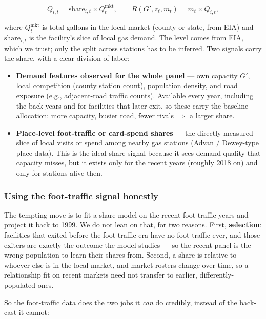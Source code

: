 \documentclass[
  letterpaper,
  DIV=11,
  numbers=noendperiod]{scrartcl}
\providecommand{\tightlist}{%
  \setlength{\itemsep}{0pt}\setlength{\parskip}{0pt}}\usepackage{longtable,booktabs,array}
\begin{document}
\[
Q_{i,t} = \text{share}_{i,t} \times Q^{\text{mkt}}_{t},
\qquad R(G', z_\ell, m_t) = m_t \times Q_{i,t},
\]

where \(Q^{\text{mkt}}_t\) is total gallons in the local market (county
or state, from EIA) and \(\text{share}_{i,t}\) is the facility's slice
of local gas demand. The level comes from EIA, which we trust; only the
split across stations has to be inferred. Two signals carry the share,
with a clear division of labor:

\begin{itemize}
\tightlist
\item
  \textbf{Demand features observed for the whole panel} --- own capacity
  \(G'\), local competition (county station count), population density,
  and road exposure (e.g., adjacent-road traffic counts). Available
  every year, including the back years and for facilities that later
  exit, so these carry the baseline allocation: more capacity, busier
  road, fewer rivals \(\Rightarrow\) a larger share.
\item
  \textbf{Place-level foot-traffic or card-spend shares} --- the
  directly-measured slice of local visits or spend among nearby gas
  stations (Advan / Dewey-type place data). This is the ideal share
  signal because it sees demand quality that capacity misses, but it
  exists only for the recent years (roughly 2018 on) and only for
  stations alive then.
\end{itemize}

\subsubsection{Using the foot-traffic signal
honestly}\label{using-the-foot-traffic-signal-honestly}

The tempting move is to fit a share model on the recent foot-traffic
years and project it back to 1999. We do not lean on that, for two
reasons. First, \textbf{selection}: facilities that exited before the
foot-traffic era have no foot-traffic ever, and those exiters are
exactly the outcome the model studies --- so the recent panel is the
wrong population to learn their shares from. Second, a share is relative
to whoever else is in the local market, and market rosters change over
time, so a relationship fit on recent markets need not transfer to
earlier, differently-populated ones.

So the foot-traffic data does the two jobs it \emph{can} do credibly,
instead of the back-cast it cannot:
\end{document}

